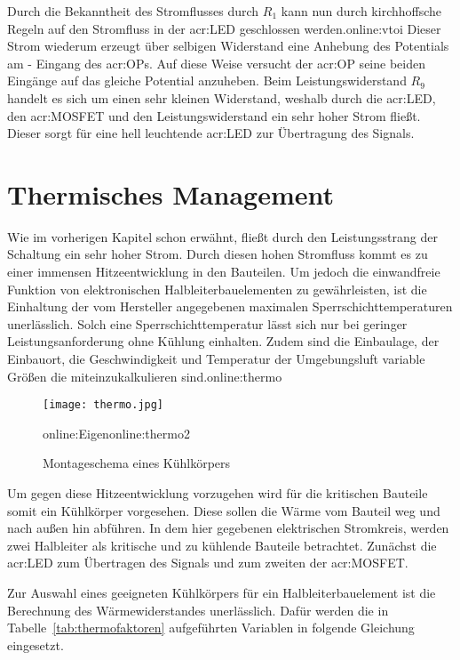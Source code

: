 Durch die Bekanntheit des Stromflusses durch $R_1$ kann nun durch kirchhoffsche Regeln auf den Stromfluss in der \gls{acr:LED} geschlossen werden.\gls{online:vtoi} Dieser Strom wiederum erzeugt über selbigen Widerstand eine Anhebung des Potentials am - Eingang des \gls{acr:OP}s. Auf diese Weise versucht der \gls{acr:OP} seine beiden Eingänge auf das gleiche Potential anzuheben. Beim Leistungswiderstand $R_{9}$ handelt es sich um einen sehr kleinen Widerstand, weshalb durch die \gls{acr:LED}, den \gls{acr:MOSFET} und den Leistungswiderstand ein sehr hoher Strom fließt. Dieser sorgt für eine hell leuchtende \gls{acr:LED} zur Übertragung des Signals.


\section{Thermisches Management}
\label{subsub:thermo}
Wie im vorherigen Kapitel schon erwähnt, fließt durch den Leistungsstrang der Schaltung ein sehr hoher Strom. Durch diesen hohen Stromfluss kommt es zu einer immensen Hitzeentwicklung in den Bauteilen. Um jedoch die einwandfreie Funktion von elektronischen Halbleiterbauelementen zu gewährleisten, ist die Einhaltung der vom Hersteller angegebenen maximalen Sperrschichttemperaturen unerlässlich. Solch eine Sperrschichttemperatur lässt sich nur bei geringer Leistungsanforderung ohne Kühlung einhalten. Zudem sind die Einbaulage, der Einbauort, die Geschwindigkeit und Temperatur der Umgebungsluft variable Größen die miteinzukalkulieren sind.\gls{online:thermo}

\begin{figure}[H]
	\centering
	\texttt{[image: thermo.jpg]}
	\caption[Montageschema eines Kühlkörpers]{Montageschema eines Kühlkörpers} \gls{online:Eigen}\gls{online:thermo2}
	\label{fig:thermo}
\end{figure}

Um gegen diese Hitzeentwicklung vorzugehen wird für die kritischen Bauteile somit ein Kühlkörper vorgesehen. Diese sollen die Wärme vom Bauteil weg und nach außen hin abführen. In dem hier gegebenen elektrischen Stromkreis, werden zwei Halbleiter als kritische und zu kühlende Bauteile betrachtet. Zunächst die \gls{acr:LED} zum Übertragen des Signals und zum zweiten der \gls{acr:MOSFET}.\cite{thermLED}

Zur Auswahl eines geeigneten Kühlkörpers für ein Halbleiterbauelement ist die Berechnung des Wärmewiderstandes unerlässlich. Dafür werden die in Tabelle~\ref{tab:thermofaktoren} aufgeführten Variablen in folgende Gleichung eingesetzt.

